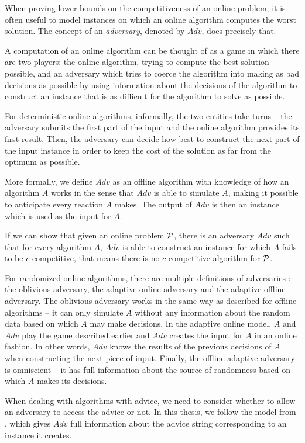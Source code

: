 When proving lower bounds on the competitiveness of an online problem, it
is often useful to model instances on which an online algorithm computes
the worst solution. The concept of an \emph{adversary}, denoted by $Adv$,
does precisely that.

A computation of an online algorithm can be thought of as a game in which
there are two players: the online algorithm, trying to compute the best
solution possible, and an adversary which tries to coerce the algorithm
into making as bad decisions as possible by using information about the
decisions of the algorithm to construct an instance that is as difficult
for the algorithm to solve as possible.

For deterministic online algorithms, informally, the two entities take
turns -- the adversary submits the first part of the input and the online
algorithm provides its first result. Then, the adversary can decide how
best to construct the next part of the input instance in order to keep the
cost of the solution as far from the optimum as possible.

More formally, we define $Adv$ as an offline algorithm with knowledge of
how an algorithm $A$ works in the sense that $Adv$ is able to simulate
$A$, making it possible to anticipate every reaction $A$ makes. The output
of $Adv$ is then an instance which is used as the input for $A$.

If we can show that given an online problem $\mathcal{P}$, there is an
adversary $Adv$ such that for every algorithm $A$, $Adv$ is able to
construct an instance for which $A$ fails to be $c$-competitive, that
means there is no $c$-competitive algorithm for $\mathcal{P}$.

For randomized online algorithms, there are multiple definitions of
adversaries \cite{adversaries}: the oblivious adversary, the adaptive
online adversary and the adaptive offline adversary. The oblivious
adversary works in the same way as described for offline algorithms -- it
can only simulate $A$ without any information about the random data based
on which $A$ may make decisions. In the adaptive online model, $A$ and
$Adv$ play the game described earlier and $Adv$ creates the input for $A$
in an online fashion. In other words, $Adv$ knows the results of the
previous decisions of $A$ when constructing the next piece of input.
Finally, the offline adaptive adversary is omniscient -- it has full
information about the source of randomness based on which $A$ makes its
decisions.

When dealing with algorithms with advice, we need to consider whether to
allow an adversary to access the advice or not. In this thesis, we follow
the model from \cite{komm-thesis}, which gives $Adv$ full information
about the advice string corresponding to an instance it creates.

